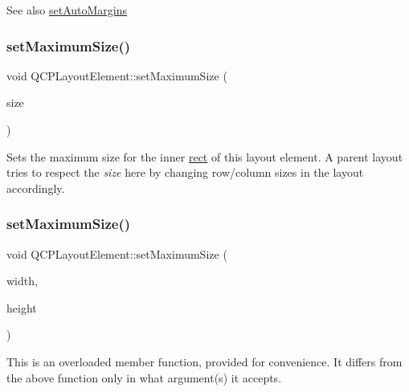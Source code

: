 \begin{DoxySeeAlso}{See also}
\hyperlink{class_q_c_p_layout_element_accfda49994e3e6d51ed14504abf9d27d}{set\+Auto\+Margins} 
\end{DoxySeeAlso}
\hypertarget{class_q_c_p_layout_element_a74eb5280a737ab44833d506db65efd95}{}\label{class_q_c_p_layout_element_a74eb5280a737ab44833d506db65efd95} 
\subsubsection{\texorpdfstring{set\+Maximum\+Size()}{setMaximumSize()}\hspace{0.1cm}{\footnotesize\ttfamily [1/2]}}
{\footnotesize\ttfamily void Q\+C\+P\+Layout\+Element\+::set\+Maximum\+Size (\begin{DoxyParamCaption}\item[{const Q\+Size \&}]{size }\end{DoxyParamCaption})}

Sets the maximum size for the inner \hyperlink{class_q_c_p_layout_element_a208effccfe2cca4a0eaf9393e60f2dd4}{rect} of this layout element. A parent layout tries to respect the {\itshape size} here by changing row/column sizes in the layout accordingly. \hypertarget{class_q_c_p_layout_element_a03e0e9c48f230217c529b0819f832d84}{}\label{class_q_c_p_layout_element_a03e0e9c48f230217c529b0819f832d84} 
\subsubsection{\texorpdfstring{set\+Maximum\+Size()}{setMaximumSize()}\hspace{0.1cm}{\footnotesize\ttfamily [2/2]}}
{\footnotesize\ttfamily void Q\+C\+P\+Layout\+Element\+::set\+Maximum\+Size (\begin{DoxyParamCaption}\item[{int}]{width,  }\item[{int}]{height }\end{DoxyParamCaption})}

This is an overloaded member function, provided for convenience. It differs from the above function only in what argument(s) it accepts.

